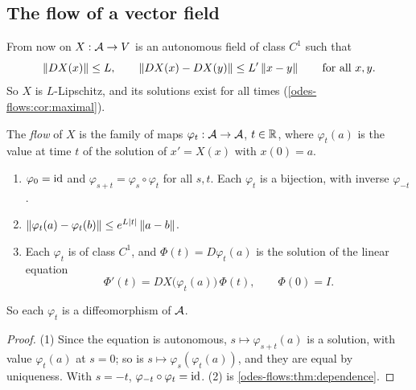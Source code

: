 \begin{notechapter}
\section{The flow of a vector field}\label{odes-flows:sec:flow}

From now on $X:\mathcal{A}\to V$ is an autonomous field of class $C^1$ such
that
\begin{equation}\label{odes-flows:eq:standing}
  \left\|DX(x)\right\|\leq L , \qquad
  \left\|DX(x) - DX(y)\right\|\leq L'\left\|x - y\right\|
  \qquad\text{for all }x, y .
\end{equation}
So $X$ is $L$-Lipschitz, and its solutions exist for all times
(\cref{odes-flows:cor:maximal}).

\begin{definition}[Flow]\label{odes-flows:def:flow}
The \emph{flow} of $X$ is the family of maps
$\varphi_t:\mathcal{A}\to\mathcal{A}$, $t\in\mathbb{R}$, where $\varphi_t(a)$ is the value at
time $t$ of the solution of $x' = X(x)$ with $x(0) = a$.
\end{definition}

\begin{theorem}
\label{odes-flows:thm:flow}
\begin{enumerate}[nosep]
  \item $\varphi_0 = \mathrm{id}$ and
        $\varphi_{s+t} = \varphi_s\circ\varphi_t$ for all $s, t$. Each
        $\varphi_t$ is a bijection, with inverse $\varphi_{-t}$.
  \item $\left\|\varphi_t(a) - \varphi_t(b)\right\|
        \leq e^{L\left|t\right|}\left\|a - b\right\|$.
  \item Each $\varphi_t$ is of class $C^1$, and
        $\Phi(t) = D\varphi_t(a)$ is the solution of the linear
        equation
        \[
          \Phi'(t) = DX\bigl(\varphi_t(a)\bigr)\,\Phi(t) ,
          \qquad \Phi(0) = I .
        \]
\end{enumerate}
So each $\varphi_t$ is a diffeomorphism of $\mathcal{A}$.
\end{theorem}

\begin{proof}
(1) Since the equation is autonomous, $s\mapsto\varphi_{s+t}(a)$ is a
solution, with value $\varphi_t(a)$ at $s = 0$; so is
$s\mapsto\varphi_s(\varphi_t(a))$, and they are equal by uniqueness.
With $s = -t$, $\varphi_{-t}\circ\varphi_t = \mathrm{id}$. (2) is
\cref{odes-flows:thm:dependence}.


\end{proof}
\end{notechapter}
